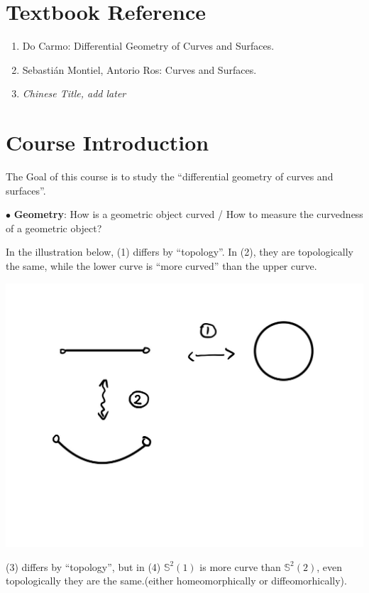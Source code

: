 \section*{Textbook Reference}
\begin{enumerate}[(1)]
    \item Do Carmo: Differential Geometry of Curves and Surfaces.
    \item Sebasti\'an Montiel, Antorio Ros: Curves and Surfaces.
    \item \textit{Chinese Title, add later}
\end{enumerate}
\section*{Course Introduction}
The Goal of this course is to study the ``differential geometry of curves and surfaces''.

\noindent
$\bullet$ \textbf{Geometry}: How is a geometric object curved / How to measure the curvedness of a geometric object? 
\begin{example}
     In the illustration below, (1) differs by ``topology''. In (2), they are topologically the same, while the lower curve is ``more curved'' than the upper curve.
\end{example}

\begin{center}
    \includegraphics[scale=0.3]{picture/preface_example1.jpg}
\end{center}

\begin{example}
    (3) differs by ``topology'', but in (4) $\mathbb{S}^2(1)$ is more curve than $\mathbb{S}^2(2)$, even topologically they are the same.(either homeomorphically or diffeomorhically).
\end{example}

